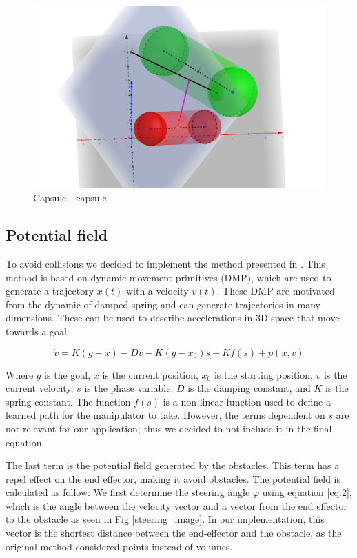\documentclass[a4paper, 10pt, conference]{ieeeconf}      %
\begin{document}
\begin{figure}[H]
    \centering
    \includegraphics[scale=0.15]{images/capsule-capsule.png}
    \caption{Capsule - capsule}
    \label{fig:capsule_capsule}
\end{figure}


\subsection{Potential field} %

To avoid collisions we decided to implement the method presented in \cite{1}. This method is based on dynamic movement primitives (DMP), which are used to generate a trajectory $x(t)$ with a velocity $v(t)$. These DMP are motivated from the dynamic of damped spring and can generate trajectories in many dimensions. These can be used to describe accelerations in 3D space that move towards a goal:

\begin{equation} \label{eq:1}
	\dot{v} = K ( g - x ) - D v - K (g - x_0) s + K f(s) + p(x, v)
\end{equation}

Where $g$ is the goal, $x$ is the current position, $x_0$ is the starting position, $v$ is the current velocity, $s$ is the phase variable, $D$ is the damping constant, and $K$ is the spring constant. The function $f(s)$ is a non-linear function used to define a learned path for the manipulator to take. However, the terms dependent on $s$ are not relevant for our application; thus we decided to not include it in the final equation.  

The last term is the potential field generated by the obstacles. This term has a repel effect on the end effector, making it avoid obstacles. The potential field is calculated as follow: We first determine the steering angle $\varphi$ using equation \ref{eq:2}, which is the angle between the velocity vector and a vector from the end effector to the obstacle as seen in Fig \ref{steering_image}. In our implementation, this vector is the shortest distance between the end-effector and the obstacle, as the original method considered points instead of volumes.
\end{document}

